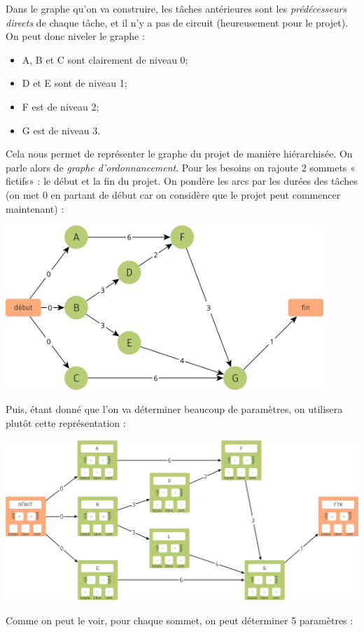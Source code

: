 Dans le graphe qu'on va construire, les tâches antérieures sont les \textit{prédécesseurs directs} de chaque tâche, et il n'y a pas de circuit (heureusement pour le projet). On peut donc niveler le graphe :
\begin{itemize}
    \item 	A, B et C sont clairement de niveau 0;
    \item 	D et E sont de niveau 1;
    \item 	F est de niveau 2;
    \item 	G est de niveau 3.
\end{itemize}
Cela nous permet de représenter le graphe du projet de manière hiérarchisée. On parle alors de \textit{graphe d'ordonnancement}. Pour les besoins on rajoute 2 sommets « fictifs»{} : le début et la fin du projet. On pondère les arcs par les durées des tâches (on met 0 en partant de début car on considère que le projet peut commencer maintenant) :
\begin{center}
    \includegraphics[width=12cm]{graphes2/img/exemple_mpm0.png}
\end{center}
Puis, étant donné que l'on va déterminer beaucoup de paramètres, on utilisera plutôt cette représentation :
\begin{center}
    \includegraphics[width=\linewidth]{graphes2/img/exemple_mpm1.png}
\end{center}
Comme on peut le voir, pour chaque sommet, on peut déterminer 5 paramètres :\\

